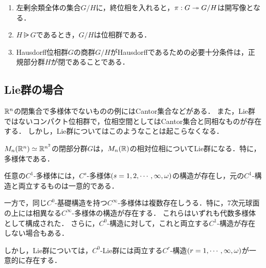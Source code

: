 \documentclass[uplatex,dvipdfmx]{jsreport}
\begin{document}
\begin{proposition}[商群の位相]\mbox{}
    \begin{enumerate}
        \item 左剰余類全体の集合$G/H$に，終位相を入れると，$\pi:G\twoheadrightarrow G/H$は開写像となる．
        \item $H\rsub G$であるとき，$G/H$は位相群である．
        \item Hausdorff位相群$G$の商群$G/H$がHausdorffであるための必要十分条件は，正規部分群$H$が閉であることである．
    \end{enumerate}
\end{proposition}

\subsection{Lie群の場合}

\begin{tcolorbox}[colframe=ForestGreen, colback=ForestGreen!10!white,breakable,colbacktitle=ForestGreen!40!white,coltitle=black,fonttitle=\bfseries\sffamily,
title=Lie群は，群構造によって，位相多様体としての微分構造が非常に素直になる]
    $\mathbb{R}^n$の閉集合で多様体でないものの例にはCantor集合などがある．
    また，Lie群ではないコンパクト位相群で，位相空間としてはCantor集合と同相なものが存在する．
    しかし，Lie群についてはこのようなことは起こらなくなる．
\end{tcolorbox}

\begin{theorem}
    $M_n(\mathbb{R}^n)\simeq\mathbb{R}^{n^2}$の閉部分群$G$は，$M_n(\mathbb{R})$の相対位相についてLie群になる．特に，多様体である．
\end{theorem}

\begin{theorem}
    任意の$C^1$-多様体には，$C^s$-多様体$(s=1,2,\cdots,\infty,\omega)$の構造が存在し，元の$C^1$-構造と両立するものは一意的である．
\end{theorem}
\begin{remark}
    一方で，同じ$C^0$-基礎構造を持つ$C^\infty$-多様体は複数存在しうる．特に，7次元球面の上には相異なる$C^\infty$-多様体の構造が存在する．
    これらはいずれも代数多様体として構成された．
    さらに，$C^0$-構造に対して，これと両立する$C^1$-構造が存在しない場合もある．
\end{remark}

\begin{remarks}
    しかし，Lie群については，$C^0$-Lie群には両立する$C^r$-構造$(r=1,\cdots,\infty,\omega)$が一意的に存在する．
\end{remarks}
\end{document}
